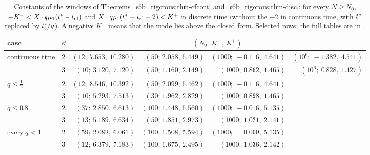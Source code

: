 \begin{table}[tbp]
\centering
\caption{Constants of the windows of Theorems~\ref{s6b_rigorous:thm-cfcont} and~\ref{s6b_rigorous:thm-disc}: for
every $N\ge N_0$, $-K^{-}<X\cdot q\mu_{1}(t^{*}-t_{\mathrm{cf}})$ and $X\cdot q\mu_{1}(t^{*}-t_{\mathrm{cf}}-2)<K^{+}$ in discrete time
(without the $-2$ in continuous time, with $t^{*}$ replaced by $t^{*}_{\mathrm{c}}/q$). A negative $K^{-}$ means that the mode
lies above the closed form. Selected rows; the full tables are in .}
\label{s6b_rigorous:tab-windows}
\footnotesize\setlength{\tabcolsep}{3.5pt}
\begin{tabular}{@{}llrrrr@{}}
\toprule
case & $\dd$ & \multicolumn{4}{c}{$(N_0;\ K^{-},\ K^{+})$}\\
\midrule
continuous time & 2 & $(12;\ 7.653,\ 10.280)$ & $(50;\ 2.058,\ 5.449)$ & $(1000;\ -0.116,\ 4.641)$ & $(10^{6};\ -1.382,\ 4.641)$\\
 & 3 & $(10;\ 3.120,\ 7.120)$ & $(50;\ 1.160,\ 2.149)$ & $(1000;\ 0.862,\ 1.465)$ & $(10^{6};\ 0.828,\ 1.427)$\\
$q\le\frac12$ & 2 & $(12;\ 8.546,\ 10.392)$ & $(50;\ 2.099,\ 5.462)$ & $(1000;\ -0.116,\ 4.641)$ & \\
 & 3 & $(10;\ 5.293,\ 7.513)$ & $(30;\ 1.962,\ 2.829)$ & $(1000;\ 0.898,\ 1.465)$ & \\
$q\le0.8$ & 2 & $(37;\ 2.850,\ 6.613)$ & $(100;\ 1.448,\ 5.560)$ & $(1000;\ -0.016,\ 5.135)$ & \\
 & 3 & $(13;\ 5.189,\ 6.634)$ & $(50;\ 1.851,\ 2.973)$ & $(1000;\ 1.021,\ 2.141)$ & \\
every $q<1$ & 2 & $(59;\ 2.082,\ 6.061)$ & $(100;\ 1.508,\ 5.594)$ & $(1000;\ -0.009,\ 5.135)$ & \\
 & 3 & $(12;\ 6.379,\ 7.183)$ & $(100;\ 1.675,\ 2.495)$ & $(1000;\ 1.036,\ 2.142)$ & \\
\bottomrule
\end{tabular}
\end{table}

